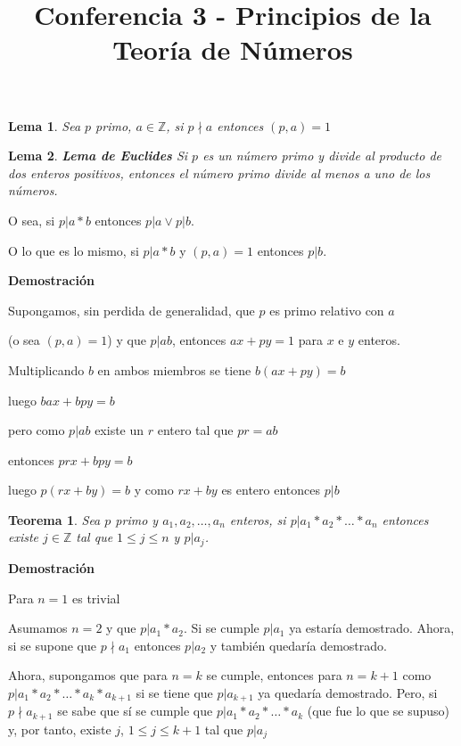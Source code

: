 \documentclass[a4paper,12pt]{report}
\title{Conferencia 3 - Principios de la Teoría de Números}
\author{}
\newtheorem*{teo}{Teorema}
\newtheorem*{lem}{Lema}
\begin{document}
\maketitle


\begin{lem}
 Sea $p$ primo, $a\in\mathbb{Z}$, si $p\nmid a$ entonces $(p,a)=1$
\end{lem}

\begin{lem}
 \textbf{Lema de Euclides} Si $p$ es un número primo y divide al producto de dos enteros positivos, entonces el número primo divide al menos a uno de los números. 
\end{lem}

O sea, si $p|a*b$ entonces $p|a\vee p|b$. 

O lo que es lo mismo, si $p|a*b$ y $(p,a)=1$ entonces $p|b$.

\textbf{Demostración}

Supongamos, sin perdida de generalidad, que $p$ es primo relativo con $a$

(o sea $(p,a)=1$) y que $p|ab$, entonces $ax+py=1$ para $x$ e $y$ enteros.

Multiplicando $b$ en ambos miembros se tiene $b(ax+py)=b$ 

luego $bax+bpy=b$

pero como $p|ab$ existe un $r$ entero tal que $pr=ab$

entonces $prx+bpy=b$

luego $p(rx+by)=b$ y como $rx+by$ es entero entonces $p|b$

\begin{teo}
 Sea $p$ primo y $a_1,a_2,\dots,a_n$ enteros, si $p|a_1*a_2*\dots*a_n$ entonces existe $j\in\mathbb{Z}$ tal que $1\leq j\leq n$  y $p|a_j$.
\end{teo}

\textbf{Demostración}

Para $n=1$ es trivial

Asumamos $n=2$ y que $p|a_1*a_2$.  Si se cumple $p|a_1$ ya estaría demostrado. Ahora, si se supone que $p\nmid a_1$ entonces $p|a_2$ y también quedaría demostrado.

Ahora, supongamos que para $n=k$ se cumple, entonces para $n=k+1$ como $p|a_1*a_2*\dots *a_k*a_{k+1}$ si se tiene que $p|a_{k+1}$ ya quedaría demostrado. Pero, si $p\nmid a_{k+1}$ se sabe que sí se cumple que $p|a_1*a_2*\dots *a_k$ (que fue lo que se supuso) y, por tanto, existe $j$, $1\leq j \leq k+1$ tal que $p|a_j$
\end{document}
